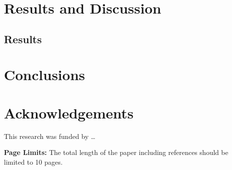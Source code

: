 \documentclass[12pt]{ussci}
\begin{document}
\section{Results and Discussion}
%
\blindtext

\subsection{Results}
%
\blindtext

\section{Conclusions}
%
\blindtext

\blindtext

\section{Acknowledgements}
This research was funded by \ldots

\noindent\textbf{Page Limits:} The total length of the paper including references should be limited to 10 pages.

\printbibliography
\end{document}
